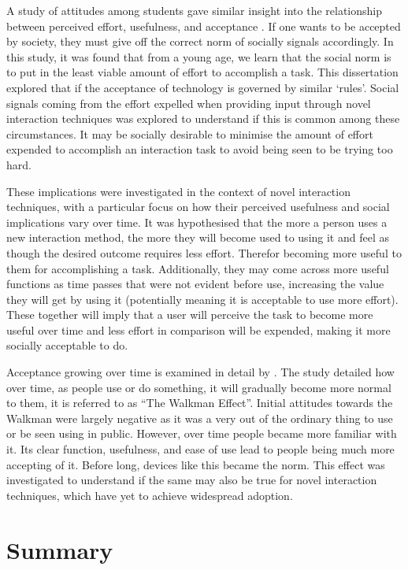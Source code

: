 \documentclass{l4proj}
\begin{document}
A study of attitudes among students gave similar insight into the relationship between perceived effort, usefulness, and acceptance \citep{warrington_student_2000}. If one wants to be accepted by society, they must give off the correct norm of socially signals accordingly. In this study, it was found that from a young age, we learn that the social norm is to put in the least viable amount of effort to accomplish a task. This dissertation explored that if the acceptance of technology is governed by similar `rules'. Social signals coming from the effort expelled when providing input through novel interaction techniques was explored to understand if this is common among these circumstances. It may be socially desirable to minimise the amount of effort expended to accomplish an interaction task to avoid being seen to be trying too hard.

These implications were investigated in the context of novel interaction techniques, with a particular focus on how their perceived usefulness and social implications vary over time. It was hypothesised that the more a person uses a new interaction method, the more they will become used to using it and feel as though the desired outcome requires less effort. Therefor becoming more useful to them for accomplishing a task. Additionally, they may come across more useful functions as time passes that were not evident before use, increasing the value they will get by using it (potentially meaning it is acceptable to use more effort). These together will imply that a user will perceive the task to become more useful over time and less effort in comparison will be expended, making it more socially acceptable to do. 

Acceptance growing over time is examined in detail by \citet{hosokawa_walkman_1984}. The study detailed how over time, as people use or do something, it will gradually become more normal to them, it is referred to as ``The Walkman Effect''. Initial attitudes towards the Walkman were largely negative as it was a very out of the ordinary thing to use or be seen using in public. However, over time people became more familiar with it. Its clear function, usefulness, and ease of use lead to people being much more accepting of it. Before long, devices like this became the norm. This effect was investigated to understand if the same may also be true for novel interaction techniques, which have yet to achieve widespread adoption.

\section{Summary}
\end{document}
